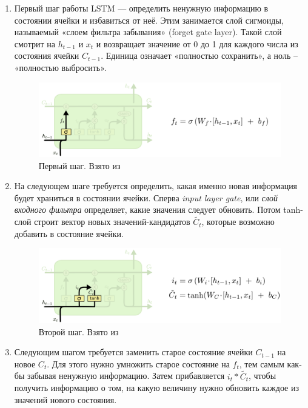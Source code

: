 \documentclass[14pt]{extarticle}
\begin{document}
\begin{enumerate}

\item
Первый шаг работы LSTM --- определить ненужную информацию в состоянии ячейки и избавиться от неё. Этим занимается слой сигмоиды, называемый «слоем фильтра забывания» (forget gate layer). Такой слой смотрит на $h_{t-1}$  и $x_t$ и возвращает значение от 0 до 1 для каждого числа из состояния ячейки $C_{t-1}$. Единица означает «полностью сохранить», а ноль – «полностью выбросить».

\begin{figure}[h]
	\centering
	\includegraphics[width=1\textwidth]{img/LSTM-step_1.png}
	\caption{Первый шаг. Взято из \cite{Colah}}
	\label{fig:lstm-s1}
\end{figure}

\item
На следующем шаге требуется определить, какая именно новая информация будет храниться в состоянии ячейки. Сперва {\it input layer gate}, или {\it слой входного фильтра} определяет, какие значения следует обновить. Потом tanh-слой строит вектор новых значений-кандидатов $\widetilde{C_t}$, которые возможно добавить в состояние ячейки.

\begin{figure}[h]
	\centering
	\includegraphics[width=1\textwidth]{img/LSTM_step_2.png}
	\caption{Второй шаг. Взято из \cite{Colah}}
	\label{fig:lstm-s2}
\end{figure}

\item
Следующим шагом требуется заменить старое состояние ячейки $C_{t - 1}$  на новое $C_t$. Для этого нужно умножить старое состояние на $f_t$, тем самым как-бы забывая ненужную информацию. Затем прибавляется $i_t * \widetilde{C_t}$, чтобы получить информацию о том, на какую величину нужно обновить каждое из значений нового состояния.


\end{enumerate}
\end{document}
